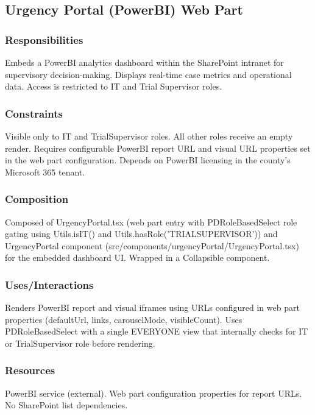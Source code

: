 \documentclass[12pt]{article}
\begin{document}
\subsection{Urgency Portal (PowerBI) Web Part}

\subsubsection{Responsibilities}

Embeds a PowerBI analytics dashboard within the SharePoint intranet for supervisory decision-making. Displays real-time case metrics and operational data. Access is restricted to IT and Trial Supervisor roles.

\subsubsection{Constraints}

Visible only to IT and TrialSupervisor roles. All other roles receive an empty render. Requires configurable PowerBI report URL and visual URL properties set in the web part configuration. Depends on PowerBI licensing in the county's Microsoft 365 tenant.

\subsubsection{Composition}

Composed of UrgencyPortal.tsx (web part entry with PDRoleBasedSelect role gating using Utils.isIT() and Utils.hasRole('TRIALSUPERVISOR')) and UrgencyPortal component (src/components/urgencyPortal/UrgencyPortal.tsx) for the embedded dashboard UI. Wrapped in a Collapsible component.

\subsubsection{Uses/Interactions}

Renders PowerBI report and visual iframes using URLs configured in web part properties (defaultUrl, links, carouselMode, visibleCount). Uses PDRoleBasedSelect with a single EVERYONE view that internally checks for IT or TrialSupervisor role before rendering.

\subsubsection{Resources}

PowerBI service (external). Web part configuration properties for report URLs. No SharePoint list dependencies.
\end{document}
